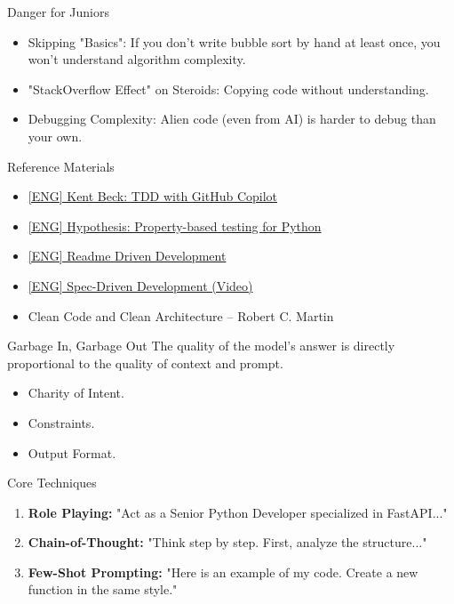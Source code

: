 \documentclass[aspectratio=169]{beamer}
\begin{document}
\begin{frame}[t]{Danger for Juniors}
    \begin{itemize}
        \item Skipping "Basics": If you don't write bubble sort by hand at least once, you won't understand algorithm complexity.
        \item "StackOverflow Effect" on Steroids: Copying code without understanding.
        \item Debugging Complexity: Alien code (even from AI) is harder to debug than your own.
    \end{itemize}
\end{frame}

\begin{frame}[t]{Reference Materials}
    \begin{itemize}
        \item \href{https://tidyfirst.substack.com/p/tdd-with-github-copilot}{[ENG] Kent Beck: TDD with GitHub Copilot}
        \item \href{https://hypothesis.readthedocs.io/en/latest/}{[ENG] Hypothesis: Property-based testing for Python}
        \item \href{https://tom.preston-werner.com/2010/08/23/readme-driven-development.html}{[ENG] Readme Driven Development}
        \item \href{https://youtu.be/3le-v1Pme44?si=8EUp8FMyfkamfjHT}{[ENG] Spec-Driven Development (Video)}
        \item Clean Code and Clean Architecture -- Robert C. Martin
    \end{itemize}
\end{frame}



\begin{frame}[t]{Garbage In, Garbage Out}
    The quality of the model's answer is directly proportional to the quality of context and prompt.
    \begin{itemize}
        \item Charity of Intent.
        \item Constraints.
        \item Output Format.
    \end{itemize}
\end{frame}

\begin{frame}[t]{Core Techniques}
    \begin{enumerate}
        \item \textbf{Role Playing:} "Act as a Senior Python Developer specialized in FastAPI..."
        \item \textbf{Chain-of-Thought:} "Think step by step. First, analyze the structure..."
        \item \textbf{Few-Shot Prompting:} "Here is an example of my code. Create a new function in the same style."
    \end{enumerate}
\end{frame}
\end{document}
